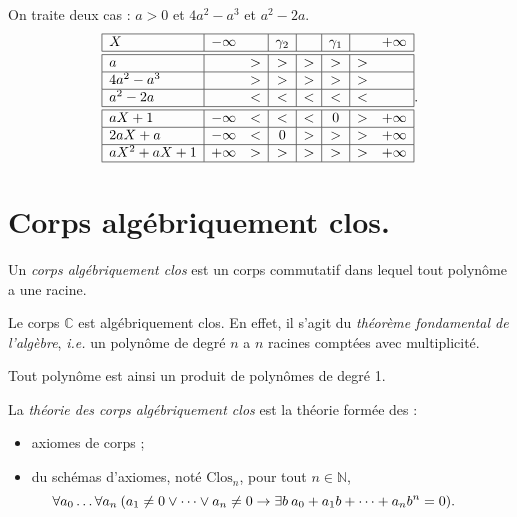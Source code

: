\documentclass[./main]{subfiles}
\begin{document}
\begin{exm}
    On traite deux cas : $a > 0$ et $4a^2 - a^3$ et $a^2 - 2a$.
    \[
    \begin{array}{|l|cc|c|c|c|cc|}
      \hline
      X & -\infty & & \gamma_2 & & \gamma_1 & & +\infty\\ \hline \hline
      a &   & > & > & > & > & > &   \\ \hline
      4a^2 - a^3 &   & > & > & > & > & > &   \\ \hline
      a^2 - 2a &   & < & < & < & < & < &   \\ \hline \hline
      aX + 1 & -\infty & < & < & < & 0 & > & +\infty \\ \hline
      2aX + a & -\infty & < & 0 & > & > & > & +\infty \\ \hline
      a X^2 + a X + 1 & +\infty & > & > & > & > & > & +\infty \\ \hline
    \end{array}
    .\] 
  \end{exm}

  \section{Corps algébriquement clos.}

  \begin{defn}
    Un \textit{corps algébriquement clos} est un corps commutatif dans lequel tout polynôme a une racine.
  \end{defn}

  \begin{exm}
    Le corps $\mathds{C}$ est algébriquement clos. En effet, il s'agit du \textit{théorème fondamental de l'algèbre}, \textit{i.e.} un polynôme de degré $n$ a $n$ racines comptées avec multiplicité.

    Tout polynôme est ainsi un produit de polynômes de degré 1.
  \end{exm}

  \begin{defn}
    La \textit{théorie des corps algébriquement clos} est la théorie formée des :
    \begin{itemize}
      \item axiomes de corps ;
      \item du schémas d'axiomes, noté $\mathrm{Clos}_n$, pour tout $n \in \mathds{N}$, 
        \[
          \hspace{-2.5em} \forall a_0 \ldots \forall a_n \: (a_1 \neq 0 \lor \cdots \lor a_n \neq 0 \to \exists b \: a_0 + a_1 b + \cdots + a_n b^n = 0)
        .\] 
    \end{itemize}
  \end{defn}
\end{document}
